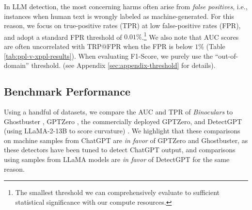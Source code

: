 \documentclass{article} %
\begin{document}
In LLM detection, the most concerning harms often arise from {\em false positives}, i.e., instances when human text is wrongly labeled as machine-generated. 
For this reason, we focus on true-positive rates (TPR) at low false-positive rates (FPR), and adopt a standard FPR threshold of $0.01\%$.\footnote{The smallest threshold we can comprehensively evaluate to sufficient statistical significance with our compute resources.}
We also note that AUC scores are often uncorrelated with TRP$@$FPR when the FPR is below $1\%$ (Table \ref{tab:ppl-v-xppl-results}). 
When evaluating F1-Score, we purely use the ``out-of-domain'' threshold. (see Appendix \ref{sec:appendix-threshold} for details).

\subsection{Benchmark Performance}
\label{sec:benchmarks}

Using a handful of datasets, we compare the AUC and TPR of \emph{Binoculars} to Ghostbuster \citep{verma_ghostbuster_2023}, GPTZero \citep{tian_gptzero_2023}, the commercially deployed
GPTZero, and DetectGPT (using LLaMA-2-13B to score curvature) \citep{mitchell_detectgpt_2023}. 
We highlight that these comparisons on machine samples from ChatGPT are \textit{in favor} of GPTZero and Ghostbuster, as these detectors have been tuned to detect ChatGPT output, and comparisons using samples from LLaMA models are \textit{in favor} of DetectGPT for the same reason. 

\end{document}
